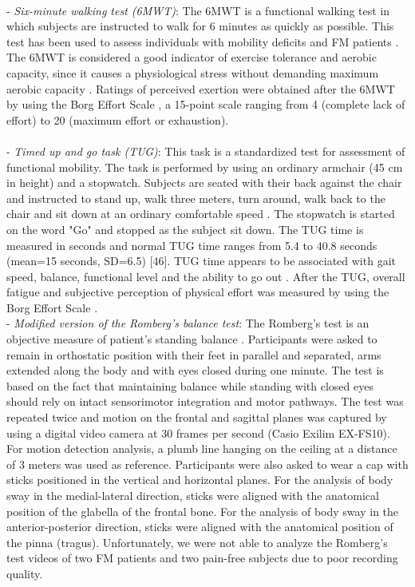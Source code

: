 \documentclass[12pt]{article}
\begin{document}
\\
- \emph{Six-minute walking test (6MWT)}: The 6MWT is a functional walking test in which subjects are instructed to walk for 6 minutes as quickly as possible. This test has been used to assess individuals with mobility deficits \cite{marc2005comparison} and FM patients \cite{latorre2014analysis, pankoff2000reliability, king1999validity}. The 6MWT is considered a good indicator of exercise tolerance and aerobic capacity, since it causes a physiological stress without demanding maximum aerobic capacity \cite{pankoff2000reliability}. Ratings of perceived exertion were obtained after the 6MWT by using the Borg Effort Scale \cite{borg1982psychophysical}, a 15-point scale ranging from 4 (complete lack of effort) to 20 (maximum effort or exhaustion).\\
\\
- \emph{Timed up and go task (TUG)}: This task is a standardized test for assessment of functional mobility. The task is performed by using an ordinary armchair (45 cm in height) and a stopwatch. Subjects are seated with their back against the chair and instructed to stand up, walk three meters, turn around, walk back to the chair and sit down at an ordinary comfortable speed \cite{Shumway-Cook2000, podsiadlo1991timed}. The stopwatch is started on the word "Go" and stopped as the subject sit down. The TUG time is measured in seconds and normal TUG time ranges from 5.4 to 40.8 seconds (mean=15 seconds, SD=6.5) [46]. TUG time appears to be associated with gait speed, balance, functional level and the ability to go out \cite{Shumway-Cook2000, podsiadlo1991timed}. After the TUG, overall fatigue and subjective perception of physical effort was measured by using the Borg Effort Scale \cite{borg1982psychophysical}.\\
- \emph{Modified version of the Romberg's balance test}: The Romberg's test is an objective measure of patient's standing balance \cite{khasnis2003romberg}. Participants were asked to remain in orthostatic position with their feet in parallel and separated, arms extended along the body and with eyes closed during one minute. The test is based on the fact that maintaining balance while standing with closed eyes should rely on intact sensorimotor integration and motor pathways. The test was repeated twice and motion on the frontal and sagittal planes was captured by using a digital video camera at 30 frames per second (Casio Exilim EX-FS10). For motion detection analysis, a plumb line hanging on the ceiling at a distance of 3 meters was used as reference. Participants were also asked to wear a cap with sticks positioned in the vertical and horizontal planes. For the analysis of body sway in the medial-lateral direction, sticks were aligned with the anatomical position of the glabella of the frontal bone. For the analysis of body sway in the anterior-posterior direction, sticks were aligned with the anatomical position of the pinna (tragus). Unfortunately, we were not able to analyze the Romberg's test videos of two FM patients and two pain-free subjects due to poor recording quality.\\
\end{document}
